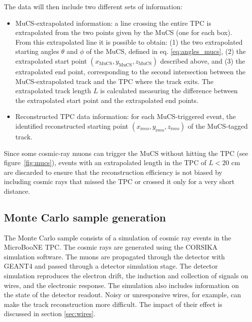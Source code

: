\documentclass[a4paper,11pt]{article}
\begin{document}
The data will then include two different sets of information:
\begin{itemize}
  \item MuCS-extrapolated information: a line crossing the entire TPC is extrapolated from the two points given by the MuCS (one for each box). From this extrapolated line it is possible to obtain: (1) the two extrapolated starting angles $\theta$ and $\phi$ of the MuCS, defined in eq. \eqref{eq:angles_mucs}, (2) the extrapolated start point $(x_{\mathrm{MuCS}},y_{\mathrm{MuCS}},z_{\mathrm{MuCS}})$ described above, and (3) the extrapolated end point, corresponding to the second intersection between the MuCS-extrapolated track and the TPC where the track exits. The extrapolated track length $L$ is calculated measuring the difference between the extrapolated start point and the extrapolated end points.
  \item Reconstructed TPC data information: for each MuCS-triggered event, the identified reconstructed starting point $(x_{\mathrm{reco}},y_{\mathrm{reco}},z_{\mathrm{reco}})$ of the MuCS-tagged track.
\end{itemize}

Since some cosmic-ray muons can trigger the MuCS without hitting the TPC (see figure~\ref{fig:mucs}), events with an extrapolated length in the TPC of $L < 20$ cm are discarded to ensure that the reconstruction efficiency is not biased by including cosmic rays that missed the TPC or crossed it only for a very short distance.

\subsection{Monte Carlo sample generation}\label{sec:mcgen}

The Monte Carlo sample consists of a simulation of cosmic ray events in the MicroBooNE TPC. The cosmic rays are generated using the CORSIKA \cite{corsika} simulation software. The muons are propagated through the detector with GEANT4 \cite{geant} and passed through a detector simulation stage. The detector simulation reproduces the electron drift, the induction and collection of signals on wires, and the electronic response. The simulation also includes information on the state of the detector readout. Noisy or unresponsive wires, for example, can make the track reconstruction more difficult. The impact of their effect is discussed in section \ref{sec:wires}.

\end{document}
